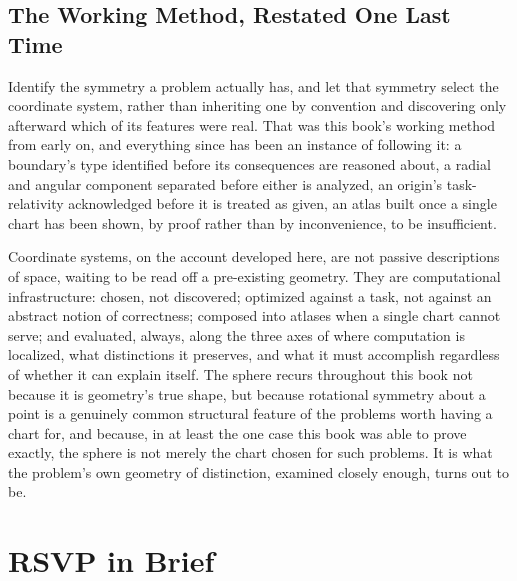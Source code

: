 \documentclass[11pt,fleqn]{book}
\numberwithin{equation}{chapter}
\theoremstyle{plain}
\theoremstyle{definition}
\theoremstyle{remark}
\begin{document}
\section{The Working Method, Restated One Last Time}

Identify the symmetry a problem actually has, and let that symmetry select the coordinate system, rather than inheriting one by convention and discovering only afterward which of its features were real. That was this book's working method from early on, and everything since has been an instance of following it: a boundary's type identified before its consequences are reasoned about, a radial and angular component separated before either is analyzed, an origin's task-relativity acknowledged before it is treated as given, an atlas built once a single chart has been shown, by proof rather than by inconvenience, to be insufficient.

Coordinate systems, on the account developed here, are not passive descriptions of space, waiting to be read off a pre-existing geometry. They are computational infrastructure: chosen, not discovered; optimized against a task, not against an abstract notion of correctness; composed into atlases when a single chart cannot serve; and evaluated, always, along the three axes of where computation is localized, what distinctions it preserves, and what it must accomplish regardless of whether it can explain itself. The sphere recurs throughout this book not because it is geometry's true shape, but because rotational symmetry about a point is a genuinely common structural feature of the problems worth having a chart for, and because, in at least the one case this book was able to prove exactly, the sphere is not merely the chart chosen for such problems. It is what the problem's own geometry of distinction, examined closely enough, turns out to be.


\appendix


\chapter{RSVP in Brief}
\end{document}

